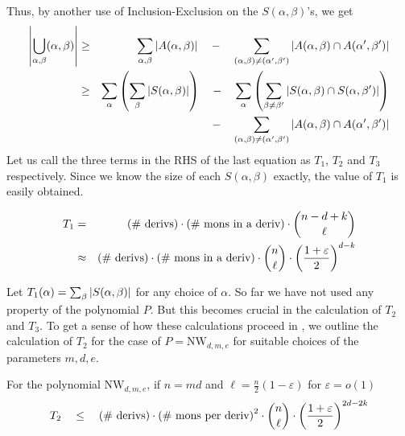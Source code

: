 \documentclass{beatcs}
\newcommand{\NW}{\mathrm{NW}}
\newcommand{\spaced}[1]{\quad#1\quad}
\renewcommand{\epsilon}{\varepsilon}
\begin{document}
Thus, by another use of Inclusion-Exclusion on the $S(\alpha, \beta)$'s, we get
\begin{eqnarray*}
\abs{\Union_{\alpha, \beta}(\alpha,\beta)}&\geq& \sum_{\alpha,\beta}\abs{A(\alpha, \beta)} \spaced{-} \sum_{(\alpha, \beta)\neq (\alpha',\beta')}\abs{A(\alpha, \beta) \intersection A(\alpha',\beta')}\\
 & \geq & \sum_\alpha \inparen{\sum_\beta \abs{S(\alpha, \beta)}} \spaced{-} \sum_\alpha \inparen{\sum_{\beta \neq \beta'}\abs{S(\alpha, \beta)\intersection S(\alpha,\beta')}}\\
 & & \quad\quad \spaced{-} \sum_{(\alpha, \beta)\neq (\alpha',\beta')}\abs{A(\alpha, \beta) \intersection A(\alpha',\beta')}
\end{eqnarray*}
Let us call the three terms in the RHS of the last equation as $T_1$, $T_2$ and $T_3$ respectively. Since we know the size of each $S(\alpha, \beta)$ exactly, the value of $T_1$ is easily obtained. 
\begin{lemma}[\cite{KS14}]\label{lem:T_1-value}
\begin{eqnarray*}
T_1 &=& \text{(\# derivs)} \cdot \text{(\# mons in a deriv)} \cdot \binom{n-d+k}{\ell}\\
    & \approx & \text{(\# derivs)} \cdot \text{(\# mons in a deriv)} \cdot \binom{n}{\ell} \cdot \inparen{\frac{1+\epsilon}{2}}^{d-k}\\
\end{eqnarray*}
\end{lemma}
Let $T_1(\alpha) =\sum_\beta \left|S(\alpha, \beta)\right|$ for any choice of $\alpha$. 
So far we have not used any property of the polynomial $P$. But this becomes crucial in the calculation of $T_2$ and $T_3$. To get a sense of how these calculations proceed in \cite{KS14}, we outline the calculation of $T_2$ for the case of $P = \NW_{d,m,e}$ for suitable choices of the parameters $m,d,e$. 
\begin{lemma}[\cite{KS14}]\label{lem:T_2-for-NW}
For the polynomial $\NW_{d,m,e}$, if $n = md$ and $\ell = \frac{n}{2}(1 - \epsilon)$ for $\epsilon = o(1)$
\[
T_2 \quad \leq \quad\text{(\# derivs)} \cdot \text{(\# mons per deriv)}^2\cdot \binom{n}{\ell} \cdot \inparen{\frac{1+\epsilon}{2}}^{2d -2k}
\]
\end{lemma}
\end{document}
